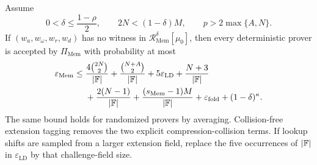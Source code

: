 \begin{theorem}
\label{thm:memory-soundness}
Assume
\begin{equation}
  0<\delta\le\frac{1-\rho}{2},
  \qquad
  2N<(1-\delta)M,
  \qquad
  p>2\max\{A,N\}.
  \label{eq:memory-soundness-parameters}
\end{equation}
If $(w_a,w_\omega,w_r,w_d)$ has no witness in $\mathcal R^{\delta}_{\mathrm{Mem}}[\mu_0]$, then every deterministic prover is accepted by $\Pi_{\mathrm{Mem}}$ with probability at most
\begin{equation}
\begin{split}
  \varepsilon_{\mathrm{Mem}}
  \le{}&
  \frac{4\binom{2N}{2}}{|\mathbb{F}|}
  +\frac{\binom{N+A}{2}}{|\mathbb{F}|}
  +5\varepsilon_{\mathrm{LD}}
  +\frac{N+3}{|\mathbb{F}|}
  \\
  &+\frac{2(N-1)}{|\mathbb{F}|}
  +\frac{(s_{\mathrm{Mem}}-1)M}{|\mathbb{F}|}
  +\varepsilon_{\mathrm{fold}}
  +(1-\delta)^\kappa.
\end{split}
\label{eq:memory-soundness-bound}
\end{equation}
The same bound holds for randomized provers by averaging.  Collision-free extension tagging removes the two explicit compression-collision terms.  If lookup shifts are sampled from a larger extension field, replace the five occurrences of $|\mathbb{F}|$ in $\varepsilon_{\mathrm{LD}}$ by that challenge-field size.
\end{theorem}

